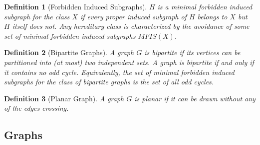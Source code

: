 \documentclass[]{article}
\theoremstyle{break}
\theoremstyle{break}
\newtheorem{definition}{Definition}[section]
\begin{document}
	\begin{definition} [Forbidden Induced Subgraphs]
		$H$ is a minimal forbidden induced subgraph for the class $X$ if every proper induced subgraph of $H$ belongs to $X$ but $H$ itself does not. Any hereditary class is characterized by the avoidance of some set of minimal forbidden induced subgraphs $MFIS(X)$.
	\end{definition}

	\begin{definition} [Bipartite Graphs]
		A graph $G$ is bipartite if its vertices can be partitioned into (at most) two independent sets. A graph is bipartite if and only if it contains no odd cycle. Equivalently, the set of minimal forbidden induced subgraphs for the class of bipartite graphs is the set of all odd cycles.
	\end{definition}

	\begin{definition} [Planar Graph]
		A graph $G$ is planar if it can be drawn without any of the edges crossing.
	\end{definition}
\subsection{Graphs}
\end{document}
